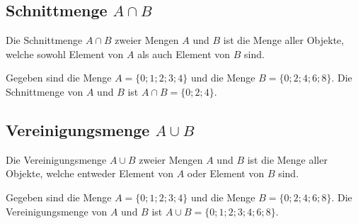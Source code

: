 \subsection{Schnittmenge $A \cap B$}
Die Schnittmenge $A \cap B$ zweier Mengen $A$ und $B$ ist die Menge aller Objekte, welche sowohl Element von $A$ als auch Element von $B$ sind.
\begin{center}
\end{center}
\begin{example}
  Gegeben sind die Menge $A = \{0;1;2;3;4\}$ und die Menge $B = \{0;2;4;6;8\}$. Die Schnittmenge von $A$ und $B$ ist $A \cap B = \{0;2;4\}$.
\end{example}

\subsection{Vereinigungsmenge $A \cup B$}
Die Vereinigungsmenge $A \cup B$ zweier Mengen $A$ und $B$ ist die Menge aller Objekte, welche entweder Element von $A$ oder Element von $B$ sind.
\begin{center}
\end{center}
\begin{example}
  Gegeben sind die Menge $A = \{0;1;2;3;4\}$ und die Menge $B = \{0;2;4;6;8\}$. Die Vereinigungsmenge von $A$ und $B$ ist $A \cup B = \{0;1;2;3;4;6;8\}$.
\end{example}

